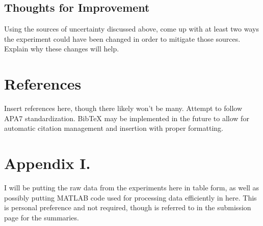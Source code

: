 \documentclass[11pt, letterpaper, notitlepage]{article}
\begin{document}
\begin{multicols}{2}
    \subsection*{Thoughts for Improvement}
    Using the sources of uncertainty discussed above, come up with at least two ways 
    the experiment could have been changed in order to mitigate those sources. Explain 
    why these changes will help.    

    \section*{References}
    Insert references here, though there likely won't be many. Attempt to follow APA7 
    standardization. BibTeX may be implemented in the future to allow for automatic 
    citation management and insertion with proper formatting.

    \section*{Appendix I.}
    I will be putting the raw data from the experiments here in table form, as well as 
    possibly putting MATLAB code used for processing data efficiently in here. This is 
    personal preference and not required, though is referred to in the submission page 
    for the summaries.
\end{multicols}
\end{document}
